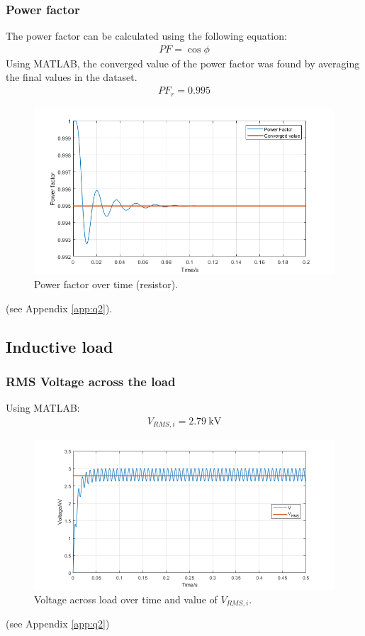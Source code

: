 \subsubsection{Power factor}
The power factor can be calculated using the following equation:
\begin{gather}
    PF = \cos \phi
\end{gather}
Using MATLAB, the converged value of the power factor was found by averaging the final values in the dataset.
\begin{gather}
    PF_{r} = 0.995
\end{gather}
\begin{figure}[H]
    \centering
    \includegraphics[width = \textwidth]{img/figure6.png}
    \caption{Power factor over time (resistor).}
    \label{fig:PFResistor}
\end{figure}
(see Appendix \ref{app:q2}).
\subsection{Inductive load}
\subsubsection{RMS Voltage across the load}
Using MATLAB:
\begin{gather}
    V_{RMS,i} = \SI{2.79}{\kilo\volt}
\end{gather}
\begin{figure}[H]
    \centering
    \includegraphics[width = \textwidth]{img/figure7.png}
    \caption{Voltage across load over time and value of $V_{RMS,i}$.}
    \label{fig:VRMSInductor}
\end{figure}
(see Appendix \ref{app:q2})
